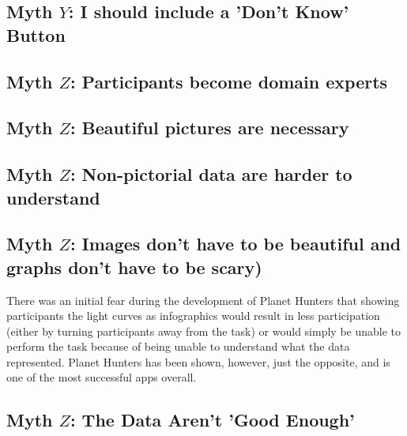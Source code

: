 \documentclass{sigchi}
\begin{document}
\subsection{Myth $Y$: I should include a 'Don't Know' Button}
\subsection{Myth $Z$: Participants become domain experts}
\subsection{Myth $Z$: Beautiful pictures are necessary}
\subsection{Myth $Z$: Non-pictorial data are harder to understand}
\subsection{Myth $Z$: Images don't have to be beautiful and graphs don't have to be scary)}
There was an initial fear during the development of Planet Hunters that showing participants the light curves as infographics would result in less participation (either by turning participants away from the task) or would simply be unable to perform the task because of being unable to understand what the data represented.  Planet Hunters has been shown, however, just the opposite, and is one of the most successful apps overall.  
\subsection{Myth $Z$: The Data Aren't 'Good Enough'}
\end{document}

